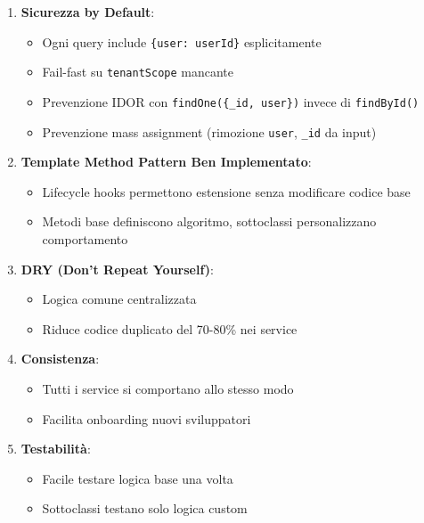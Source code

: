 \documentclass[11pt,a4paper]{article}
\begin{document}
\begin{enumerate}
    \item \textbf{Sicurezza by Default}:
    \begin{itemize}
        \item Ogni query include \texttt{\{user: userId\}} esplicitamente
        \item Fail-fast su \texttt{tenantScope} mancante
        \item Prevenzione IDOR con \texttt{findOne(\{_id, user\})} invece di \texttt{findById()}
        \item Prevenzione mass assignment (rimozione \texttt{user}, \texttt{\_id} da input)
    \end{itemize}
    
    \item \textbf{Template Method Pattern Ben Implementato}:
    \begin{itemize}
        \item Lifecycle hooks permettono estensione senza modificare codice base
        \item Metodi base definiscono algoritmo, sottoclassi personalizzano comportamento
    \end{itemize}
    
    \item \textbf{DRY (Don't Repeat Yourself)}:
    \begin{itemize}
        \item Logica comune centralizzata
        \item Riduce codice duplicato del 70-80\% nei service
    \end{itemize}
    
    \item \textbf{Consistenza}:
    \begin{itemize}
        \item Tutti i service si comportano allo stesso modo
        \item Facilita onboarding nuovi sviluppatori
    \end{itemize}
    
    \item \textbf{Testabilità}:
    \begin{itemize}
        \item Facile testare logica base una volta
        \item Sottoclassi testano solo logica custom
    \end{itemize}
\end{enumerate}
\end{document}
